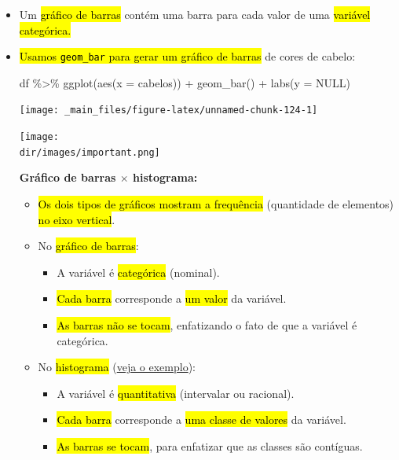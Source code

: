 \documentclass[
  11pt]{report}
\newenvironment{Shaded}{\begin{snugshade}}{\end{snugshade}}
\newcommand{\AttributeTok}[1]{\textcolor[rgb]{0.77,0.63,0.00}{#1}}
\newcommand{\ConstantTok}[1]{\textcolor[rgb]{0.00,0.00,0.00}{#1}}
\newcommand{\FunctionTok}[1]{\textcolor[rgb]{0.00,0.00,0.00}{#1}}
\newcommand{\NormalTok}[1]{#1}
\newcommand{\SpecialCharTok}[1]{\textcolor[rgb]{0.00,0.00,0.00}{#1}}
\newcommand{\dir}{/ssd/R/x86_64-pc-linux-gnu-library/4.1/fnaufelRmd/rmarkdown/resources}
\newenvironment{rmdimportant}
{
  \begin{myimportant}
    \texttt{[image: \\dir/images/important.png]}
    \tcblower
  }
  {
  \end{myimportant}
}
\renewenvironment{Shaded}{
    \begin{mdframed}[%
      roundcorner=2pt,%
      innerleftmargin=5pt,%
      innerrightmargin=5pt,%
      topline=true,%
      leftline=true,%
      rightline=true,%
      bottomline=true,%
      linewidth=0.5pt,%
      linecolor=black!20,%
      backgroundcolor=black!2,%
      skipabove=2ex,%
      skipbelow=2.5ex%
    ]%
  }
  {
    \end{mdframed}
  }
\begin{document}
\begin{itemize}
\item
  Um {\hl{gráfico de barras}} contém uma barra para cada valor de uma {\hl{variável categórica.}}
\item
  {\hl{Usamos {\mbox{\texttt{geom\_bar}}} para gerar um gráfico de barras}} de cores de cabelo:

\begin{Shaded}
\begin{Highlighting}[]
\NormalTok{df }\SpecialCharTok{\%\textgreater{}\%} 
  \FunctionTok{ggplot}\NormalTok{(}\FunctionTok{aes}\NormalTok{(}\AttributeTok{x =}\NormalTok{ cabelos)) }\SpecialCharTok{+}
    \FunctionTok{geom\_bar}\NormalTok{() }\SpecialCharTok{+}
    \FunctionTok{labs}\NormalTok{(}\AttributeTok{y =} \ConstantTok{NULL}\NormalTok{)}
\end{Highlighting}
\end{Shaded}

  \begin{center}\texttt{[image: \_main\_files/figure-latex/unnamed-chunk-124-1]} \end{center}

  \begin{rmdimportant}

  \textbf{Gráfico de barras $\times$ histograma:}

  \begin{itemize}
  \item
    {\hl{Os dois tipos de gráficos mostram a frequência}} (quantidade de elementos) {\hl{no eixo vertical}}.
  \item
    No {\hl{gráfico de barras}}:

    \begin{itemize}
    \item
      A variável é {\hl{categórica}} (nominal).
    \item
      {\hl{Cada barra}} corresponde a {\hl{um valor}} da variável.
    \item
      {\hl{As barras não se tocam}}, enfatizando o fato de que a variável é categórica.
    \end{itemize}
  \item
    No {\hl{histograma}} (\protect\hyperlink{histograma1}{veja o exemplo}):

    \begin{itemize}
    \item
      A variável é {\hl{quantitativa}} (intervalar ou racional).
    \item
      {\hl{Cada barra}} corresponde a {\hl{uma classe de valores}} da variável.
    \item
      {\hl{As barras se tocam}}, para enfatizar que as classes são contíguas.
    \end{itemize}
  \end{itemize}


\end{rmdimportant}
\end{itemize}
\end{document}
